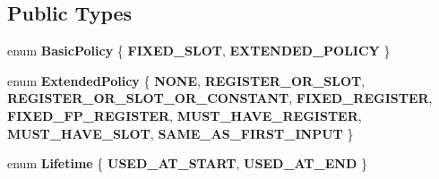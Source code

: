 \subsection*{Public Types}
\begin{DoxyCompactItemize}
\item 
\mbox{\label{classv8_1_1internal_1_1compiler_1_1UnallocatedOperand_a07530491d80058dd15f185f1970014c4}} 
enum {\bfseries Basic\+Policy} \{ {\bfseries F\+I\+X\+E\+D\+\_\+\+S\+L\+OT}, 
{\bfseries E\+X\+T\+E\+N\+D\+E\+D\+\_\+\+P\+O\+L\+I\+CY}
 \}
\item 
\mbox{\label{classv8_1_1internal_1_1compiler_1_1UnallocatedOperand_a7bdb03b8ffc2cd9db894dc3f3ded2030}} 
enum {\bfseries Extended\+Policy} \{ \newline
{\bfseries N\+O\+NE}, 
{\bfseries R\+E\+G\+I\+S\+T\+E\+R\+\_\+\+O\+R\+\_\+\+S\+L\+OT}, 
{\bfseries R\+E\+G\+I\+S\+T\+E\+R\+\_\+\+O\+R\+\_\+\+S\+L\+O\+T\+\_\+\+O\+R\+\_\+\+C\+O\+N\+S\+T\+A\+NT}, 
{\bfseries F\+I\+X\+E\+D\+\_\+\+R\+E\+G\+I\+S\+T\+ER}, 
\newline
{\bfseries F\+I\+X\+E\+D\+\_\+\+F\+P\+\_\+\+R\+E\+G\+I\+S\+T\+ER}, 
{\bfseries M\+U\+S\+T\+\_\+\+H\+A\+V\+E\+\_\+\+R\+E\+G\+I\+S\+T\+ER}, 
{\bfseries M\+U\+S\+T\+\_\+\+H\+A\+V\+E\+\_\+\+S\+L\+OT}, 
{\bfseries S\+A\+M\+E\+\_\+\+A\+S\+\_\+\+F\+I\+R\+S\+T\+\_\+\+I\+N\+P\+UT}
 \}
\item 
\mbox{\label{classv8_1_1internal_1_1compiler_1_1UnallocatedOperand_aa9669901c7a87f6a4218fb4f66412f1f}} 
enum {\bfseries Lifetime} \{ {\bfseries U\+S\+E\+D\+\_\+\+A\+T\+\_\+\+S\+T\+A\+RT}, 
{\bfseries U\+S\+E\+D\+\_\+\+A\+T\+\_\+\+E\+ND}
 \}
\end{DoxyCompactItemize}
